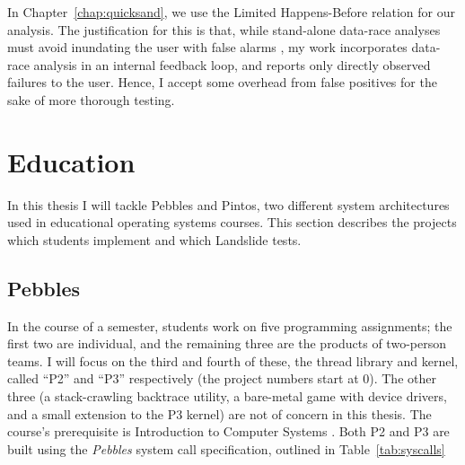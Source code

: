 
In Chapter~\ref{chap:quicksand}, we use the Limited Happens-Before relation for our analysis.
The justification for this is that, while stand-alone data-race analyses must avoid inundating the user with false alarms \cite{racerx},
my work incorporates data-race analysis in an internal feedback loop, and reports only directly observed failures to the user.
Hence, I accept some overhead from false positives for the sake of more thorough testing.


\section{Education}
\label{sec:overview-edu}

In this thesis I will tackle Pebbles and Pintos, two different system architectures used in educational operating systems courses.
This section describes the projects which students implement and which Landslide tests.

\subsection{Pebbles}
\label{sec:pebbles}

In the course of a semester, students work on five programming assignments;
the first two are individual, and the remaining three are the products of two-person teams.
I will focus on the third and fourth of these, the thread library and kernel,
called ``P2'' and ``P3'' respectively (the project numbers start at 0).
The other three (a stack-crawling backtrace utility, a bare-metal game with device drivers, and a small extension to the P3 kernel) are not of concern in this thesis.
The course's prerequisite is Introduction to Computer Systems \cite{sigcse01:CSaPP}.
Both P2 and P3 are built using the {\em Pebbles} system call specification, outlined in Table~\ref{tab:syscalls}

